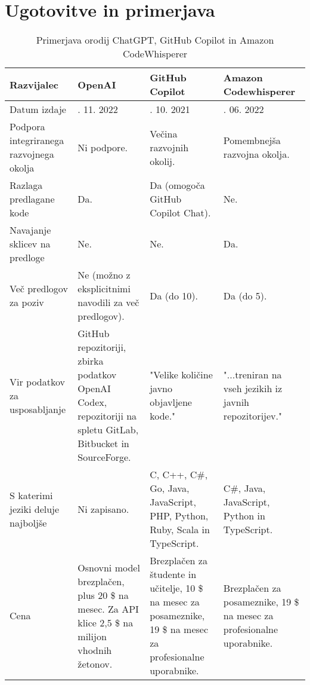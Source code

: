 \documentclass[a4paper,12pt,openright]{book}
\begin{document}
\section{Ugotovitve in primerjava}



\begin{longtable}{|>{\raggedright\arraybackslash}p{2.5cm}|>{\raggedright\arraybackslash}p{3cm}|>{\raggedright\arraybackslash}p{3.5cm}|>{\raggedright\arraybackslash}p{3cm}|}
\caption{Primerjava orodij ChatGPT, GitHub Copilot in Amazon CodeWhisperer} \label{fig:primerjava-tabela}\\
\hline
Razvijalec              & OpenAI      & GitHub Copilot                 & Amazon Codewhisperer            \\ \hline
Datum izdaje               & 30. 11. 2022        & 29. 10. 2021           & 23. 06. 2022       \\ \hline
Podpora integriranega razvojnega okolja           & Ni podpore.          & Večina razvojnih okolij.        & Pomembnejša razvojna okolja.          \\ \hline
Razlaga predlagane kode       & Da.                       & Da (omogoča GitHub Copilot Chat).                           & Ne.                       \\ \hline
Navajanje sklicev na predloge                  & Ne.                      & Ne.                    & Da.                      \\ \hline
Več predlogov za poziv                & Ne (možno z eksplicitnimi navodili za več predlogov).         & Da (do 10).                  & Da (do 5).               \\ \hline
Vir podatkov za usposabljanje             & GitHub repozitoriji, zbirka podatkov OpenAI Codex, repozitoriji na spletu GitLab, Bitbucket in SourceForge.                   & "Velike količine javno objavljene kode."                  & "...treniran na vseh jezikih iz javnih repozitorijev."                    \\ \hline
S katerimi jeziki deluje najboljše                        & Ni zapisano.                  & C, C++, C\#, Go, Java, JavaScript, PHP, Python, Ruby, Scala in TypeScript.              & C\#, Java, JavaScript, Python in TypeScript.  \\ \hline
Cena               & Osnovni model brezplačen, plus 20  \$ na mesec. Za API klice 2,5 \$ na milijon vhodnih žetonov.           & Brezplačen za študente in učitelje, 10 \$ na mesec za posameznike, 19 \$ na mesec za profesionalne uporabnike.                    &   Brezplačen za posameznike, 19 \$ na mesec za profesionalne uporabnike.    \\ \hline
\end{longtable}
\end{document}
